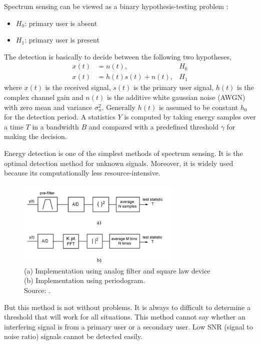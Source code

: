 Spectrum sensing can be viewed as a binary hypothesis-testing problem 
\cite{zhang09}:
\begin{itemize}[noitemsep,topsep=0pt,parsep=0pt,partopsep=0pt]
    \item $H_0$: primary user is absent
    \item $H_1$: primary user is present
\end{itemize}
The detection is basically to decide between the following two hypotheses,
\begin{align}
    x(t) &= n(t), & H_0 \nonumber \\
    x(t) &= h(t)s(t) + n(t), & H_1 \nonumber
\end{align}
where $x(t)$ is the received signal, $s(t)$ is the primary user signal, $h(t)$
is the complex channel gain and $n(t)$ is the additive white gaussian noise
(AWGN) with zero mean and variance $\sigma_n^2$. Generally $h(t)$ is assumed
to be constant $h_0$ for the detection period. A statistics $Y$ is computed by
taking energy samples over a time $T$ in a bandwidth $B$ and compared with a 
predefined threshold $\gamma$ for making the decision.

Energy detection is one of the simplest methods of spectrum sensing. It is the 
optimal detection method for unknown signals. Moreover, it is widely used 
because its computationally less resource-intensive.

\begin{figure}
    \centering
    \includegraphics[width=0.7\textwidth]{../images/energyDetection}
    \caption[Energy Detection block diagram]{(a) Implementation using analog 
    filter and square law device \\
    (b) Implementation using periodogram. \\
    Source: {\cite{cabric06}}.}
    \label{energyDetection}
\end{figure}

But this method is not without problems. It is always to difficult to 
determine a threshold that will work for all situations. This method cannot
say whether an interfering signal is from a primary user or a secondary user.
Low SNR (signal to noise ratio) signals cannot be detected easily.

